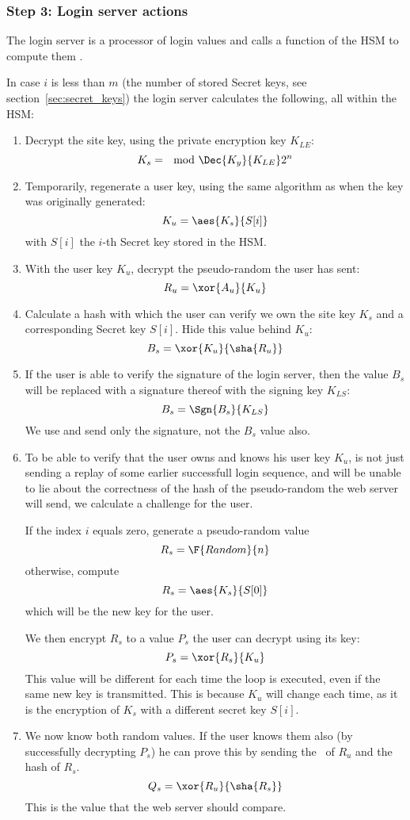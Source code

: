 \subsubsection{Step 3: Login server actions}
\label{sec:login_step3}
The login server is a processor of login values and calls a function of the HSM to compute them
.
\par
In case $i$ is less than $m$
(the number of stored Secret keys, see section~\vref{sec:secret_keys})
the login server calculates the following, all within the HSM:
\begin{enumerate}
\item Decrypt the site key, using the private encryption key $K_{LE}$:
\[K_s=\mod{\Dec{K_y}{K_{LE}}}{2^n}\]
\item Temporarily, regenerate a user key, using the same algorithm as when the key was originally generated:
\[K_u=\aes{K_s}{S[i]}\]
with $S[i]$ the $i$-th Secret key stored in the HSM.
\item With the user key $K_u$, decrypt the pseudo-random the user has sent:
\[R_u=\xor{A_u}{K_u}\]
\item Calculate a hash with which the user can verify we own the site key $K_s$ and a corresponding Secret key $S[i]$.
Hide this value behind $K_u$:
\[B_s=\xor{K_u}{\sha{R_u}}\]
\item If the user is able to verify the signature of the login server,
then the value $B_s$ will be replaced with a signature thereof with the signing key $K_{LS}$:
\[B_s=\Sgn{B_s}{K_{LS}}\]
We use and send only the signature, not the $B_s$ value also.
\item To be able to verify that the user owns and knows his user key $K_u$,
is not just sending a replay of some earlier successfull login sequence,
and will be unable to lie about the correctness of the hash of the pseudo-random the web server will send,
we calculate a challenge for the user.
\par
If the index $i$ equals zero, generate a pseudo-random value
\[R_s=\F{Random}{n}\]
otherwise, compute
\[R_s=\aes{K_s}{S[0]}\]
which will be the new key for the user.
\par
We then encrypt $R_s$ to a value $P_s$ the user can decrypt using its key:
\[P_s=\xor{R_s}{K_u}\]
This value will be different for each time the loop is executed,
even if the same new key is transmitted.
This is because $K_u$ will change each time,
as it is the encryption of $K_s$ with a different secret key $S[i]$.
\item We now know both random values.
If the user knows them also
(by successfully decrypting $P_s$)
he can prove this by sending the \XOR\ of $R_u$ and the hash of $R_s$.
\[Q_s=\xor{R_u}{\sha{R_s}}\]
This is the value that the web server should compare.
\end{enumerate}
